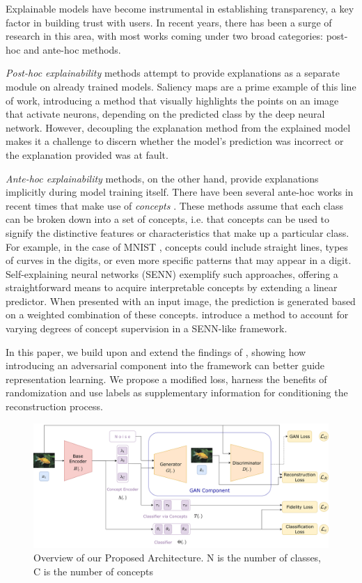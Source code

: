 \documentclass[letterpaper]{article}
\begin{document}
Explainable models have become instrumental in establishing transparency, a key factor in building trust with users.
In recent years, there has been a surge of research in this area, with most works coming under two broad categories: post-hoc and ante-hoc methods.

\textit{Post-hoc explainability} methods attempt to provide explanations as a separate module on already trained models.
Saliency maps \cite{saliency_maps} are a prime example of this line of work, introducing a method that visually highlights the points on an image that activate neurons, depending on the predicted class by the deep neural network.  However, decoupling the explanation method from the explained model makes it a challenge to discern whether the model's prediction was incorrect or the explanation provided was at fault.

\textit{Ante-hoc explainability} methods, on the other hand, provide explanations implicitly during model training itself. There have been several ante-hoc works in recent times that make use of \textit{concepts} \cite{CBM, efros, efros2}. These methods assume that each class can be broken down into a set of concepts, i.e. that concepts can be used to signify the distinctive features or characteristics that make up a particular class. For example, in the case of MNIST \cite{MNSIT}, concepts could include straight lines, types of curves in the digits, or even more specific patterns that may appear in a digit.
Self-explaining neural networks (SENN) \cite{SENN} exemplify such approaches, offering a straightforward means to acquire interpretable concepts by extending a linear predictor. When presented with an input image, the prediction is generated based on a weighted combination of these concepts.
\cite{Sarkar2021AFF} introduce a method to account for varying degrees of concept supervision in a SENN-like framework.


In this paper, we build upon and extend the findings of \cite{Sarkar2021AFF}, showing how introducing an adversarial component into the framework can better guide representation learning. We propose a modified loss, harness the benefits of randomization and use labels as supplementary information for conditioning the reconstruction process.

\begin{figure}[h!]
    \centering
\includegraphics[width=1.8\columnwidth]{images/senndiag.png}
    \caption{Overview of our Proposed Architecture. N is the number of classes, C is the number of concepts}
    \label{fig:senn_gan}
\end{figure}
\end{document}
